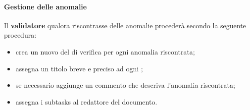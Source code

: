 	\paragraph{Gestione delle anomalie}
			Il \textbf{validatore} qualora riscontrasse delle anomalie procederà secondo la seguente procedura:
			\begin{itemize}
				\item crea un nuovo  del  di verifica per ogni anomalia riscontrata;
				\item assegna un titolo breve e preciso ad ogni ;
				\item se necessario aggiunge un commento che descriva l'anomalia riscontrata;
				\item assegna i subtasks al redattore del documento.
			\end{itemize}